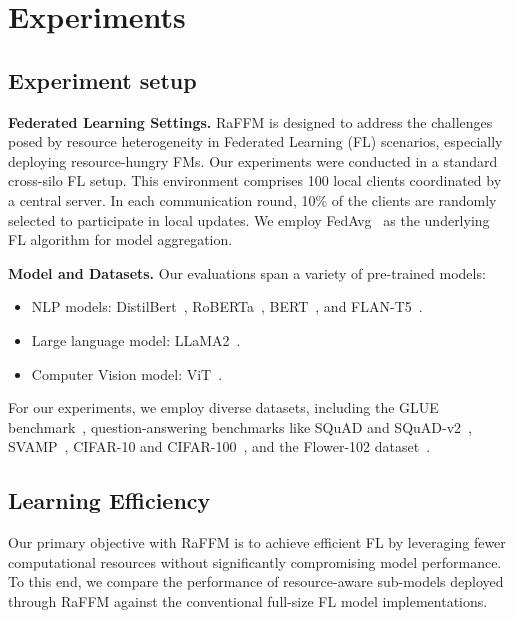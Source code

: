 \section{Experiments}
\label{sec:exp}
\subsection{Experiment setup}
\label{sec:exp_setup}
\textbf{Federated Learning Settings.} 
RaFFM is designed to address the challenges posed by resource heterogeneity in Federated Learning (FL) scenarios, especially deploying resource-hungry FMs. Our experiments were conducted in a standard cross-silo FL setup. This environment comprises 100 local clients coordinated by a central server. In each communication round, 10\% of the clients are randomly selected to participate in local updates. We employ FedAvg~\citep{mcmahan2017fedavg} as the underlying FL algorithm for model aggregation.



\textbf{Model and Datasets.}
Our evaluations span a variety of pre-trained models:
\begin{itemize}
    \item NLP models: DistilBert~\citep{sanh2019distilbert}, RoBERTa~\citep{liu2019roberta}, BERT~\citep{kenton2019bert}, and FLAN-T5~\citep{chung2022flan-t5}.
    \item Large language model: LLaMA2~\citep{touvron2023llama2}.
    \item Computer Vision model: ViT~\citep{dosovitskiy2020vit}.
\end{itemize}
For our experiments, we employ diverse datasets, including the GLUE benchmark~\citep{wang2018glue}, question-answering benchmarks like SQuAD and SQuAD-v2~\citep{Rajpurkar2016squad}, SVAMP~\citep{SVAMP}, CIFAR-10 and CIFAR-100~\citep{krizhevsky2009cifar}, and the Flower-102 dataset~\citep{Nilsback08flower102}.






\subsection{Learning Efficiency}
Our primary objective with RaFFM is to achieve efficient FL by leveraging fewer computational resources without significantly compromising model performance. To this end, we compare the performance of resource-aware sub-models deployed through RaFFM against the conventional full-size FL model implementations.

